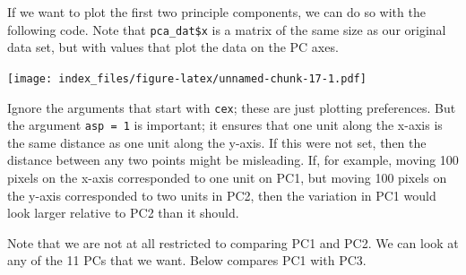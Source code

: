 \documentclass[]{article}
\newenvironment{Shaded}{\begin{snugshade}}{\end{snugshade}}
\newcommand{\DataTypeTok}[1]{\textcolor[rgb]{0.13,0.29,0.53}{#1}}
\newcommand{\DecValTok}[1]{\textcolor[rgb]{0.00,0.00,0.81}{#1}}
\newcommand{\FloatTok}[1]{\textcolor[rgb]{0.00,0.00,0.81}{#1}}
\newcommand{\KeywordTok}[1]{\textcolor[rgb]{0.13,0.29,0.53}{\textbf{#1}}}
\newcommand{\NormalTok}[1]{#1}
\newcommand{\OperatorTok}[1]{\textcolor[rgb]{0.81,0.36,0.00}{\textbf{#1}}}
\newcommand{\StringTok}[1]{\textcolor[rgb]{0.31,0.60,0.02}{#1}}
\begin{document}
If we want to plot the first two principle components, we can do so with
the following code. Note that \texttt{pca\_dat\$x} is a matrix of the
same size as our original data set, but with values that plot the data
on the PC axes.

\begin{Shaded}
\end{Shaded}

\texttt{[image: index\_files/figure-latex/unnamed-chunk-17-1.pdf]}

Ignore the arguments that start with \texttt{cex}; these are just
plotting preferences. But the argument \texttt{asp\ =\ 1} is important;
it ensures that one unit along the x-axis is the same distance as one
unit along the y-axis. If this were not set, then the distance between
any two points might be misleading. If, for example, moving 100 pixels
on the x-axis corresponded to one unit on PC1, but moving 100 pixels on
the y-axis corresponded to two units in PC2, then the variation in PC1
would look larger relative to PC2 than it should.

Note that we are not at all restricted to comparing PC1 and PC2. We can
look at any of the 11 PCs that we want. Below compares PC1 with PC3.

\begin{Shaded}
\end{Shaded}
\end{document}
